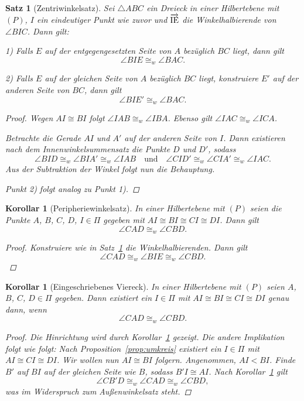 \documentclass[a4paper,12pt]{article}
\theoremstyle{break}
\newtheorem{theorem}[definition]{Satz}
\newtheorem{corollary}[definition]{Korollar}
\begin{document}
\begin{theorem}[Zentriwinkelsatz]\label{theorem:zentriwinkelsatz}
Sei \(\triangle ABC\) ein Dreieck in einer Hilbertebene mit \((P)\), \(I\) ein eindeutiger Punkt wie zuvor und \(\overrightarrow{\rm IE}\) die Winkelhalbierende von \(\angle BIC\). Dann gilt:

1) Falls \(E\) auf der entgegengesetzten Seite von \(A\) bezüglich \(BC\) liegt, dann gilt
\[
\angle BIE \cong_w \angle BAC.
\]

2) Falls \(E\) auf der gleichen Seite von \(A\) bezüglich \(BC\) liegt, konstruiere \(E'\) auf der anderen Seite von \(BC\), dann gilt
\[
\angle BIE' \cong_w \angle BAC.
\]

\begin{proof}
Wegen \(AI \cong BI\) folgt \(\angle IAB \cong_w \angle IBA\). Ebenso gilt \(\angle IAC \cong_w \angle ICA\).

Betrachte die Gerade \(AI\) und \(A'\) auf der anderen Seite von \(I\). Dann existieren nach dem Innenwinkelsummensatz die Punkte \(D\) und \(D'\), sodass
\[
\angle BID \cong_w \angle BIA' \cong_w \angle IAB \quad \text{und} \quad \angle CID' \cong_w \angle CIA' \cong_w \angle IAC.
\]
Aus der Subtraktion der Winkel folgt nun die Behauptung.

Punkt 2) folgt analog zu Punkt 1).
\end{proof}
\end{theorem}

\begin{corollary}[Peripheriewinkelsatz]\label{cor:peripheriewinkelsatz}
In einer Hilbertebene mit \((P)\) seien die Punkte \(A\), \(B\), \(C\), \(D\), \(I \in \Pi\) gegeben mit \(AI \cong BI \cong CI \cong DI\). Dann gilt
\[
\angle CAD \cong_w \angle CBD.
\]

\begin{proof}
Konstruiere wie in Satz~\ref{theorem:zentriwinkelsatz} die Winkelhalbierenden. Dann gilt
\[
\angle CAD \cong_w \angle BIE \cong_w \angle CBD.
\]
\end{proof}
\end{corollary}

\begin{corollary}[Eingeschriebenes Viereck]
In einer Hilbertebene mit \((P)\) seien \(A\), \(B\), \(C\), \(D \in \Pi\) gegeben. Dann existiert ein \(I \in \Pi\) mit \(AI \cong BI \cong CI \cong DI\) genau dann, wenn
\[
\angle CAD \cong_w \angle CBD.
\]

\begin{proof}
Die Hinrichtung wird durch Korollar~\ref{cor:peripheriewinkelsatz} gezeigt. Die andere Implikation folgt wie folgt: Nach Proposition~\ref{prop:umkreis} existiert ein \(I \in \Pi\) mit \(AI \cong CI \cong DI\). Wir wollen nun \(AI \cong BI\) folgern. Angenommen, \(AI < BI\). Finde \(B'\) auf \(BI\) auf der gleichen Seite wie \(B\), sodass \(B'I \cong AI\). Nach Korollar~\ref{cor:peripheriewinkelsatz} gilt
\[
\angle CB'D \cong_w \angle CAD \cong_w \angle CBD,
\]
was im Widerspruch zum Außenwinkelsatz steht.
\end{proof}
\end{corollary}
\end{document}
